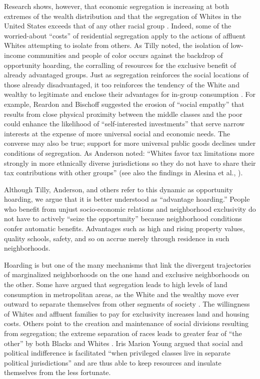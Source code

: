 \documentclass[11pt,]{article}
\begin{document}
Research shows, however, that economic segregation is increasing at both
extremes of the wealth distribution \autocite{reardon2014} and that the
segregation of Whites in the United States exceeds that of any other
racial group \autocite{feagin2014}. Indeed, some of the worried-about
``costs'' of residential segregation apply to the actions of affluent
Whites attempting to isolate from others. As Tilly
\autocite*{tilly1998durable} noted, the isolation of low-income
communities and people of color occurs against the backdrop of
opportunity hoarding, the corralling of resources for the exclusive
benefit of already advantaged groups. Just as segregation reinforces the
social locations of those already disadvantaged, it too reinforces the
tendency of the White and wealthy to legitimate and enclose their
advantages for in-group consumption \autocite{anderson2010}. For
example, Reardon and Bischoff \autocite*{reardon2014} suggested the
erosion of ``social empathy'' that results from close physical proximity
between the middle classes and the poor could enhance the likelihood of
``self-interested investments'' that serve narrow interests at the
expense of more universal social and economic needs. The converse may
also be true; support for more universal public goods declines under
conditions of segregation. As Anderson \autocite*[p.~61]{anderson2010}
noted: ``Whites favor tax limitations more strongly in more ethnically
diverse jurisdictions so they do not have to share their tax
contributions with other groups'' (see also the findings in Alesina et
al., \autocite*{alesina1999}).

Although Tilly, Anderson, and others refer to this dynamic as
opportunity hoarding, we argue that it is better understood as
``advantage hoarding.'' People who benefit from unjust socio-economic
relations and neighborhood exclusivity do not have to actively ``seize
the opportunity'' because neighborhood conditions confer automatic
benefits. Advantages such as high and rising property values, quality
schools, safety, and so on accrue merely through residence in such
neighborhoods.

Hoarding is but one of the many mechanisms that link the divergent
trajectories of marginalized neighborhoods on the one hand and exclusive
neighborhoods on the other. Some have argued that segregation leads to
high levels of land consumption in metropolitan areas, as the White and
the wealthy move ever outward to separate themselves from other segments
of society \autocite{cashin2004failures}. The willingness of Whites and
affluent families to pay for exclusivity increases land and housing
costs. Others point to the creation and maintenance of social divisions
resulting from segregation; the extreme separation of races leads to
greater fear of ``the other'' by both Blacks and Whites
\autocite{feagin2014}. Iris Marion Young \autocite*{young2002} argued
that social and political indifference is facilitated ``when privileged
classes live in separate political jurisdictions'' and are thus able to
keep resources and insulate themselves from the less fortunate.
\end{document}
